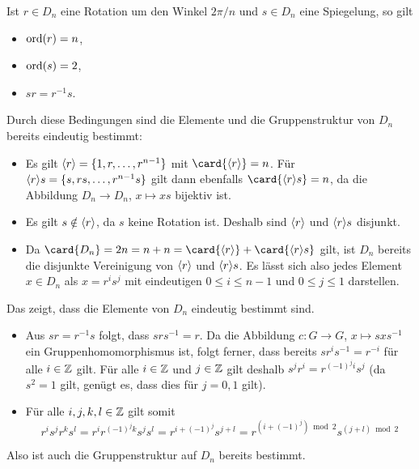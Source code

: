 \begin{remark}
  Ist $r \in D_n$ eine Rotation um den Winkel $2\pi/n$ und $s \in D_n$ eine Spiegelung, so gilt
  \begin{itemize}
    \item
      $\operatorname{ord}(r) = n$,
    \item
      $\operatorname{ord}(s) = 2$,
    \item
      $s r = r^{-1} s$.
  \end{itemize}
  Durch diese Bedingungen sind die Elemente und die Gruppenstruktur von $D_n$ bereits eindeutig bestimmt:
  \begin{itemize}
    \item
      Es gilt $\langle r\rangle = \{1, r, \dotsc, r^{n-1}\}$ mit $\card{ \generated{r} } = n$.
      Für $\langle r\rangle s = \{s, rs, \dotsc, r^{n-1} s\}$ gilt dann ebenfalls $\card{ \generated{r} s } = n$, da die Abbildung $D_n \to D_n$, $x \mapsto xs$ bijektiv ist.
    \item
      Es gilt $s \notin \langle r\rangle$, da $s$ keine Rotation ist.
      Deshalb sind $\langle r\rangle$ und $\langle r\rangle s$ disjunkt.
    \item
      Da $\card{D_n} = 2n = n + n = \card{\generated{r}} + \card{\generated{r} s}$ gilt, ist $D_n$ bereits die disjunkte Vereinigung von $\langle r\rangle$ und $\langle r\rangle s$.
      Es lässt sich also jedes Element $x \in D_n$ als $x = r^i s^j$ mit eindeutigen $0 \leq i \leq n-1$ und $0 \leq j \leq 1$ darstellen.
  \end{itemize}
  Das zeigt, dass die Elemente von $D_n$ eindeutig bestimmt sind.
  \begin{itemize}[resume]
    \item
      Aus $s r = r^{-1} s$ folgt, dass $s r s^{-1} = r$.
      Da die Abbildung $c \colon G \to G$, $x \mapsto s x s^{-1}$ ein Gruppenhomomorphismus ist, folgt ferner, dass bereits $s r^i s^{-1} = r^{-i}$ für alle $i \in \mathbb{Z}$ gilt.
      Für alle $i \in \mathbb{Z}$ und $j \in \mathbb{Z}$ gilt deshalb $s^j r^i = r^{(-1)^j i} s^j$ (da $s^2 = 1$ gilt, genügt es, dass dies für $j = 0, 1$ gilt).
    \item
      Für alle $i, j, k , l \in \mathbb{Z}$ gilt somit
      \[
          r^i s^j r^k s^l
        = r^i r^{(-1)^j k} s^j s^l
        = r^{i + (-1)^j } s^{j + l}
        = r^{(i + (-1)^j) \bmod 2} s^{(j + l) \bmod 2}
      \]
  \end{itemize}
  Also ist auch die Gruppenstruktur auf $D_n$ bereits bestimmt.
\end{remark}

